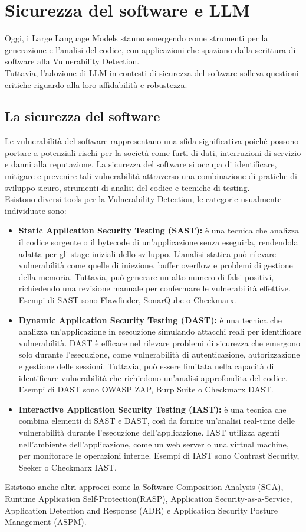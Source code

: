\section{Sicurezza del software e LLM}
Oggi, i Large Language Models stanno emergendo come strumenti per la generazione e l'analisi del codice, con applicazioni che spaziano dalla scrittura di software alla Vulnerability Detection. \\
Tuttavia, l'adozione di LLM in contesti di sicurezza del software solleva questioni critiche riguardo alla loro affidabilità e robustezza. 

\subsection{La sicurezza del software}
Le vulnerabilità del software rappresentano una sfida significativa poiché possono portare a potenziali rischi per la società come furti di dati, interruzioni di servizio e danni alla reputazione. La sicurezza del software si occupa di identificare, mitigare e prevenire tali vulnerabilità attraverso una combinazione di pratiche di sviluppo sicuro, strumenti di analisi del codice e tecniche di testing.\\
Esistono diversi tools per la Vulnerability Detection, le categorie usualmente individuate sono:
\begin{itemize}
    \item \textbf{Static Application Security Testing (SAST):} è una tecnica che analizza il codice sorgente o il bytecode di un'applicazione senza eseguirla, rendendola adatta per gli stage iniziali dello sviluppo. L'analisi statica può rilevare vulnerabilità come quelle di iniezione, buffer overflow e problemi di gestione della memoria. Tuttavia, può generare un alto numero di falsi positivi, richiedendo una revisione manuale per confermare le vulnerabilità effettive.
    Esempi di SAST sono Flawfinder, SonarQube o Checkmarx.
    \item \textbf{Dynamic Application Security Testing (DAST):} è una tecnica che analizza un'applicazione in esecuzione simulando attacchi reali per identificare vulnerabilità. DAST è efficace nel rilevare problemi di sicurezza che emergono solo durante l'esecuzione, come vulnerabilità di autenticazione, autorizzazione e gestione delle sessioni. Tuttavia, può essere limitata nella capacità di identificare vulnerabilità che richiedono un'analisi approfondita del codice.
    Esempi di DAST sono OWASP ZAP, Burp Suite o Checkmarx DAST.
    \item \textbf{Interactive Application Security Testing (IAST):} è una tecnica che combina elementi di SAST e DAST, così da fornire un'analisi real-time delle vulnerabilità durante l'esecuzione dell'applicazione. IAST utilizza agenti nell'ambiente dell'applicazione, come un web server o una virtual machine, per monitorare le operazioni interne.
    Esempi di IAST sono Contrast Security, Seeker o Checkmarx IAST.
\end{itemize}
Esistono anche altri approcci come la Software Composition Analysis (SCA), Runtime Application Self-Protection(RASP), Application Security-as-a-Service, Application Detection and Response (ADR) e Application Security Posture Management (ASPM).

